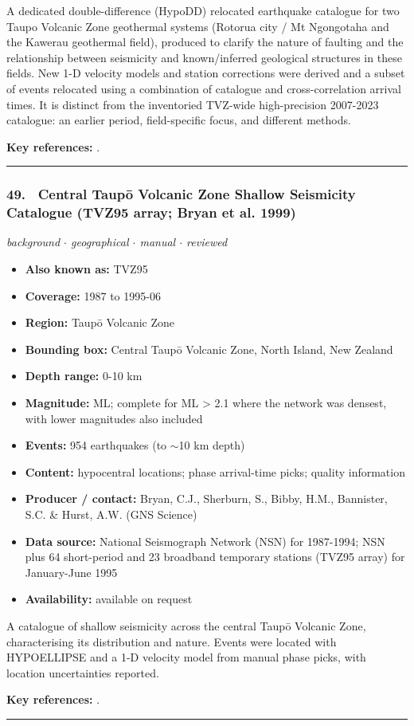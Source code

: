 \documentclass[10pt,a4paper]{article}
\newcommand{\catentryrule}{\par\vspace{3pt}\noindent\textcolor{rulegrey}{\rule{\linewidth}{0.3pt}}\par\vspace{5pt}}
\newcommand{\kv}[2]{\item \textbf{#1:} #2}
\begin{document}
\par\vspace{2pt}A dedicated double-difference (HypoDD) relocated earthquake catalogue for two Taupo Volcanic Zone geothermal systems (Rotorua city / Mt Ngongotaha and the Kawerau geothermal field), produced to clarify the nature of faulting and the relationship between seismicity and known/inferred geological structures in these fields. New 1-D velocity models and station corrections were derived and a subset of events relocated using a combination of catalogue and cross-correlation arrival times. It is distinct from the inventoried TVZ-wide high-precision 2007-2023 catalogue: an earlier period, field-specific focus, and different methods.
\par\vspace{2pt}\textbf{Key references:} \cite{Clarke2009}.
\catentryrule
\subsubsection*{\hypertarget{c:49}{49.}~ Central Taupō Volcanic Zone Shallow Seismicity Catalogue (TVZ95 array; Bryan et al. 1999)}
{\small\itshape background $\cdot$ geographical $\cdot$ manual $\cdot$ reviewed}\par\vspace{2pt}
\begin{itemize}[leftmargin=1.3em,itemsep=0.6pt,topsep=1pt,parsep=0pt]
\kv{Also known as}{TVZ95}
\kv{Coverage}{1987 to 1995-06}
\kv{Region}{Taupō Volcanic Zone}
\kv{Bounding box}{Central Taupō Volcanic Zone, North Island, New Zealand}
\kv{Depth range}{0-10 km}
\kv{Magnitude}{ML; complete for ML \textgreater{} 2.1 where the network was densest, with lower magnitudes also included}
\kv{Events}{954 earthquakes (to $\sim$10 km depth)}
\kv{Content}{hypocentral locations; phase arrival-time picks; quality information}
\kv{Producer / contact}{Bryan, C.J., Sherburn, S., Bibby, H.M., Bannister, S.C. \& Hurst, A.W. (GNS Science)}
\kv{Data source}{National Seismograph Network (NSN) for 1987-1994; NSN plus 64 short-period and 23 broadband temporary stations (TVZ95 array) for January-June 1995}
\kv{Availability}{available on request}
\end{itemize}
\par\vspace{2pt}A catalogue of shallow seismicity across the central Taupō Volcanic Zone, characterising its distribution and nature. Events were located with HYPOELLIPSE and a 1-D velocity model from manual phase picks, with location uncertainties reported.
\par\vspace{2pt}\textbf{Key references:} \cite{Bryan1999}.
\catentryrule
\end{document}
